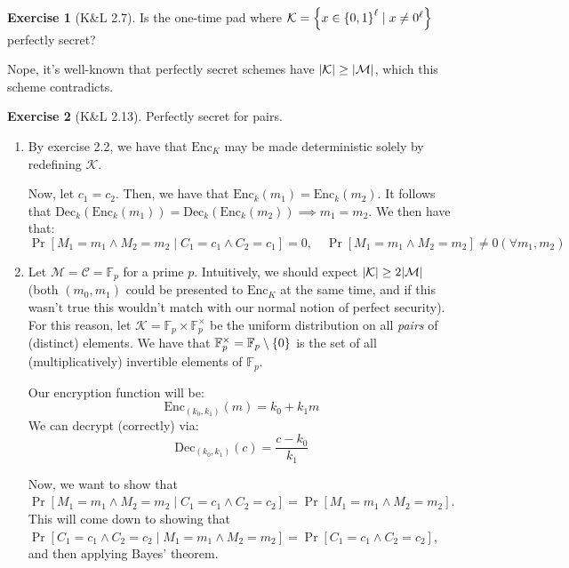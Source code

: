 \documentclass{article}
\theoremstyle{definition}
\newtheorem{exercise}{Exercise}[section]
\newcommand{\bin}{\Bqty{0,1}}
\newcommand{\enc}{\text{Enc}}
\newcommand{\dec}{\text{Dec}}
\begin{document}
\begin{exercise}[K\&L 2.7]
Is the one-time pad where $\mathcal{K} = \Bqty{x\in\bin^\ell\mid x\neq 0^\ell}$ perfectly secret?

Nope, it's well-known that perfectly secret schemes have $\abs{\mathcal{K}}\geq \abs{\mathcal{M}}$, which this scheme contradicts.
\end{exercise}
\begin{exercise}[K\&L 2.13]
Perfectly secret for pairs.
\begin{enumerate}
\item By exercise 2.2, we have that $\enc_K$ may be made deterministic solely by redefining $\mathcal{K}$.

Now, let $c_1 = c_2$.
Then, we have that $\enc_k(m_1) = \enc_k(m_2)$.
It follows that $\dec_k(\enc_k(m_1)) = \dec_k(\enc_k(m_2))\implies m_1 = m_2$.
We then have that:
\begin{equation}
\Pr[M_1 = m_1\wedge M_2 = m_2\mid C_1 = c_1\wedge C_2 = c_1] = 0,\quad \Pr[M_1 = m_1\wedge M_2 = m_2] \neq 0 (\forall m_1,m_2)
\end{equation}
\item 

Let $\mathcal{M} = \mathcal{C} = \mathbb{F}_p$ for a prime $p$.
Intuitively, we should expect $\abs{\mathcal{K}} \geq 2\abs{\mathcal{M}}$ (both $(m_0,m_1)$ could be presented to $\enc_K$ at the same time, and if this wasn't true this wouldn't match with our normal notion of perfect security).
For this reason, let $\mathcal{K} = \mathbb{F}_p\times \mathbb{F}_p^\times$ be the uniform distribution on all \emph{pairs} of (distinct) elements.
We have that $\mathbb{F}_p^\times = \mathbb{F}_p\setminus\Bqty{0}$ is the set of all (multiplicatively) invertible elements of $\mathbb{F}_p$.

Our encryption function will be:
\begin{equation}
\enc_{(k_0,k_1)}(m) = k_0 + k_1m
\end{equation}
We can decrypt (correctly) via:
\begin{equation}
\dec_{(k_0,k_1)}(c) = \frac{c-k_0}{k_1}
\end{equation}

Now, we want to show that $\Pr[M_1 = m_1\wedge M_2 = m_2\mid C_1 = c_1\wedge C_2 = c_2] = \Pr[M_1 = m_1\wedge M_2 = m_2]$.
This will come down to showing that $\Pr[C_1 = c_1\wedge C_2 = c_2\mid M_1 = m_1\wedge M_2 = m_2] = \Pr[C_1 = c_1\wedge C_2 = c_2]$, and then applying Bayes' theorem.


\end{enumerate}
\end{exercise}
\end{document}
